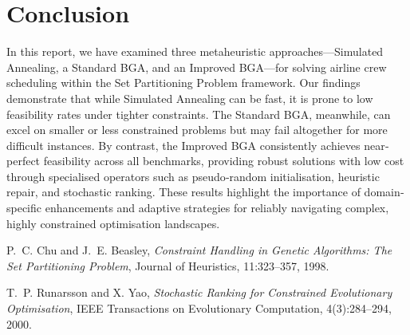\documentclass[12pt]{article}
\begin{document}
\section{Conclusion}
\label{sec:conclusion}

In this report, we have examined three metaheuristic approaches—Simulated Annealing, a Standard BGA, and an Improved BGA—for solving airline crew scheduling within the Set Partitioning Problem framework. Our findings demonstrate that while Simulated Annealing can be fast, it is prone to low feasibility rates under tighter constraints. The Standard BGA, meanwhile, can excel on smaller or less constrained problems but may fail altogether for more difficult instances. By contrast, the Improved BGA consistently achieves near‐perfect feasibility across all benchmarks, providing robust solutions with low cost through specialised operators such as pseudo‐random initialisation, heuristic repair, and stochastic ranking. These results highlight the importance of domain‐specific enhancements and adaptive strategies for reliably navigating complex, highly constrained optimisation landscapes.
\newpage

\begin{thebibliography}{9}
  P.~C. Chu and J.~E. Beasley, 
  \emph{Constraint Handling in Genetic Algorithms: The Set Partitioning Problem},
  Journal of Heuristics, 11:323--357, 1998.

  T.~P. Runarsson and X. Yao, 
  \emph{Stochastic Ranking for Constrained Evolutionary Optimisation},
  IEEE Transactions on Evolutionary Computation, 4(3):284--294, 2000.
\end{thebibliography}
\end{document}
